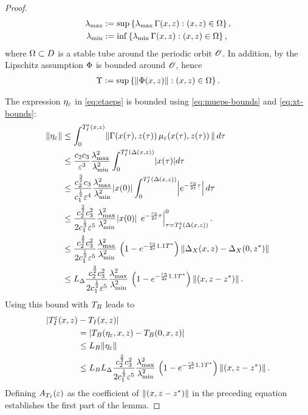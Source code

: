 \begin{proof}
  \begin{align}
    \nonumber
    \lambda_{\mathrm{max}} &:= \sup \left\{\operatorname*{\lambda_{\mathrm{max}}}\Gamma(x, z) : (x, z) \in \Omega \right\},\\
    \lambda_{\mathrm{min}} &:= \inf \left\{\operatorname*{\lambda_{\mathrm{min}}}\Gamma(x, z) : (x, z) \in \Omega \right\},
  \end{align}
  where $\Omega \subset D$ is a stable tube around the periodic orbit ${\mathscr O}$.
  In addition, by the Lipschitz assumption $\Phi$ is bounded around ${\mathscr O}$, hence
  \begin{align}
    \Upsilon := \sup \left\{ \left\| \Phi(x, z) \right\| : (x, z) \in \Omega \right\}.
  \end{align}

  The expression $\eta_{\varepsilon}$ in \eqref{eq:etaeps} is bounded using \eqref{eq:mueps-bounds} and \eqref{eq:xt-bounds}:
  \begin{align}
    \nonumber
    \|\eta_{\varepsilon}\| &\leq \int_{0}^{T_{I}^{\varepsilon}(x, z)} \! \left\| \Gamma(x(\tau), z(\tau)) \, \mu_{\varepsilon}(x(\tau), z(\tau)) \, \right\| d\tau\\
    \nonumber
    &\leq \frac{c_{2}c_{3}}{\varepsilon^{3}} \frac{\lambda_{\mathrm{max}}^{2}}{\lambda_{\mathrm{min}}^{2}} \int_{0}^{T_{I}^{\varepsilon}(\Delta(x, z))} \! |x(\tau)| d\tau\\
    \nonumber
    &\leq \frac{c_{2}^{\frac{3}{2}}c_{3}}{c_{1}^{\frac{1}{2}}\varepsilon^{4}} \frac{\lambda_{\mathrm{max}}^{2}}{\lambda_{\mathrm{min}}^{2}} |x(0)| \int_{0}^{T_{I}^{\varepsilon}(\Delta(x, z))} \! \left|e^{-\frac{c_{3}}{2\varepsilon} \tau} \right| d\tau\\
    \nonumber
    &\leq \frac{c_{2}^{\frac{3}{2}} c_{3}^{2}}{2c_{1}^{\frac{1}{2}}\varepsilon^{5}} \frac{\lambda_{\mathrm{max}}^{2}}{\lambda_{\mathrm{min}}^{2}} |x(0)| \, \left. e^{-\frac{c_{3}}{2\varepsilon} \tau} \right|^{0}_{\tau=T_{I}^{\varepsilon}(\Delta(x, z))}.\\
    \nonumber
    &\leq\frac{c_{2}^{\frac{3}{2}} c_{3}^{2}}{2c_{1}^{\frac{1}{2}}\varepsilon^{5}} \frac{\lambda_{\mathrm{max}}^{2}}{\lambda_{\mathrm{min}}^{2}}  \, \left(1 - e^{-\frac{c_{3}}{2\varepsilon} 1.1 T^{*}}\right) \left\|\Delta_{X}(x, z) - \Delta_{X}(0, z^{*})\right\|\\
    \label{eq:G-bound}
    &\leq L_{\Delta} \frac{c_{2}^{\frac{3}{2}} c_{3}^{2}}{2c_{1}^{\frac{1}{2}}\varepsilon^{5}} \frac{\lambda_{\mathrm{max}}^{2}}{\lambda_{\mathrm{min}}^{2}}  \, \left(1 - e^{-\frac{c_{3}}{2\varepsilon} 1.1 T^{*}}\right) \left\|(x, z - z^{*})\right\|.
  \end{align}
  Using this bound with $T_{B}$ leads to
  \begin{align}
    | T_{I}^{\varepsilon}(x, z) &- T_{I}(x, z) |\\
    \nonumber
    &= | T_{B}(\eta_{\varepsilon}, x, z) - T_{B}(0, x, z)|\\
    \nonumber
    &\leq L_{B} \| \eta_{\varepsilon} \|\\
    \nonumber
    &\leq L_{B} L_{\Delta} \frac{c_{2}^{\frac{3}{2}} c_{3}^{2}}{2c_{1}^{\frac{1}{2}}\varepsilon^{5}} \frac{\lambda_{\mathrm{max}}^{2}}{\lambda_{\mathrm{min}}^{2}}  \, \left(1 - e^{-\frac{c_{3}}{2\varepsilon} 1.1 T^{*}}\right) \left\|(x, z - z^{*})\right\|.
  \end{align}
  Defining $A_{T_{I}}(\varepsilon)$ as the coefficient of $\left\|(x, z - z^{*})\right\|$ in the preceding equation establishes the first part of the lemma.


\end{proof}
